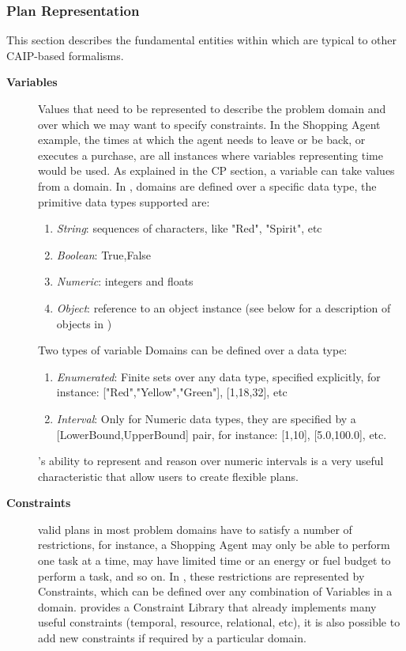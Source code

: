 \subsubsection{\eu Plan Representation}
\label{sec:europa:pr}

This section describes the fundamental entities within \eu which are
typical to other CAIP-based formalisms.

\begin{description}

\item[\textbf{Variables}] Values that need to be represented to
  describe the problem domain and over which we may want to specify
  constraints. In the Shopping Agent example, the times at which the
  agent needs to leave or be back, or executes a purchase, are all
  instances where variables representing time would be used. 
  As explained in the CP section, a variable can take values from a domain. In \eu, domains are defined over a specific data type, the primitive data types supported are:
  \begin{enumerate}
    \item \textit{String}: sequences of characters, like "Red", "Spirit", etc 
    \item \textit{Boolean}: {True,False}
    \item \textit{Numeric}: integers and floats
    \item \textit{Object}: reference to an object instance (see below for a description of objects in \eu)
  \end {enumerate}
  Two types of variable Domains can be defined over a data type: 
  \begin{enumerate}
    \item \textit{Enumerated}: Finite sets over any data type, specified explicitly, for instance: ["Red","Yellow","Green"], [1,18,32], etc
    \item \textit{Interval}: Only for Numeric data types, they are specified by a [LowerBound,UpperBound] pair, for instance: [1,10], [5.0,100.0], etc.
  \end {enumerate}
  \eu's ability to represent and reason over numeric intervals is a very useful characteristic that allow users to create flexible plans. 

\item[\textbf{Constraints}] valid plans in most problem domains have to satisfy a number of restrictions, for instance, a Shopping Agent may only be able to perform one task at a time, may have limited time or an energy or fuel budget to perform a task, and so on. In \eu, these restrictions are represented by Constraints, which can be defined over any combination of Variables in a domain. \eu provides a Constraint Library that already implements many useful constraints (temporal, resource, relational, etc), it is also possible to add new constraints if required by a particular domain.


\end{description}
